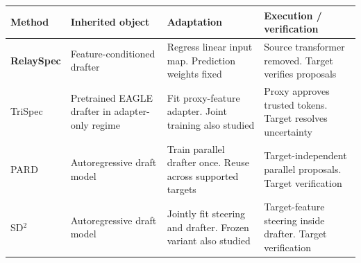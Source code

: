 \begingroup%
\small%
\setlength{\tabcolsep}{3pt}%
\renewcommand{\arraystretch}{1.08}%
\begin{tabular}{@{}>{\raggedright\arraybackslash}p{0.95in}>{\raggedright\arraybackslash}p{1.08in}>{\raggedright\arraybackslash}p{1.42in}>{\raggedright\arraybackslash}p{1.72in}@{}}
\toprule
Method & Inherited object & Adaptation & Execution / verification \\
\midrule
\textbf{RelaySpec} & Feature-conditioned drafter & Regress linear input map. Prediction weights fixed & Source transformer removed. Target verifies proposals \\
\addlinespace[3pt]
TriSpec\newline\citep{jiang2026trispec} & Pretrained EAGLE drafter in adapter-only regime & Fit proxy-feature adapter. Joint training also studied & Proxy approves trusted tokens. Target resolves uncertainty \\
\addlinespace[3pt]
PARD\newline\citep{an2026pard} & Autoregressive draft model & Train parallel drafter once. Reuse across supported targets & Target-independent parallel proposals. Target verification \\
\addlinespace[3pt]
SD$^2$\newline\citep{berdoz2026sd2} & Autoregressive draft model & Jointly fit steering and drafter. Frozen variant also studied & Target-feature steering inside drafter. Target verification \\
\bottomrule
\end{tabular}%
\endgroup%
